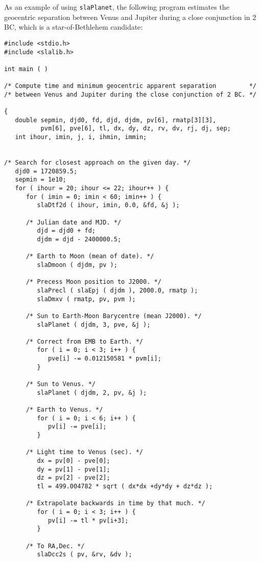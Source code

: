 \documentclass[11pt,fleqn,twoside]{article}
\renewcommand{\_}{{\tt\char'137}}     %
\begin{document}
As an example of using
{\tt slaPlanet},
the following program estimates the geocentric separation
between Venus and Jupiter during a close conjunction
in 2\,BC, which is a star-of-Bethlehem candidate:
\goodbreak
\vspace{-3ex}
\begin{verbatim}
#include <stdio.h>
#include <slalib.h>

int main ( )

/* Compute time and minimum geocentric apparent separation         */
/* between Venus and Jupiter during the close conjunction of 2 BC. */

{
   double sepmin, djd0, fd, djd, djdm, pv[6], rmatp[3][3],
          pvm[6], pve[6], tl, dx, dy, dz, rv, dv, rj, dj, sep;
   int ihour, imin, j, i, ihmin, immin;


/* Search for closest approach on the given day. */
   djd0 = 1720859.5;
   sepmin = 1e10;
   for ( ihour = 20; ihour <= 22; ihour++ ) {
      for ( imin = 0; imin < 60; imin++ ) {
         slaDtf2d ( ihour, imin, 0.0, &fd, &j );

      /* Julian date and MJD. */
         djd = djd0 + fd;
         djdm = djd - 2400000.5;

      /* Earth to Moon (mean of date). */
         slaDmoon ( djdm, pv );

      /* Precess Moon position to J2000. */
         slaPrecl ( slaEpj ( djdm ), 2000.0, rmatp );
         slaDmxv ( rmatp, pv, pvm );

      /* Sun to Earth-Moon Barycentre (mean J2000). */
         slaPlanet ( djdm, 3, pve, &j );

      /* Correct from EMB to Earth. */
         for ( i = 0; i < 3; i++ ) {
            pve[i] -= 0.012150581 * pvm[i];
         }

      /* Sun to Venus. */
         slaPlanet ( djdm, 2, pv, &j );

      /* Earth to Venus. */
         for ( i = 0; i < 6; i++ ) {
            pv[i] -= pve[i];
         }

      /* Light time to Venus (sec). */
         dx = pv[0] - pve[0];
         dy = pv[1] - pve[1];
         dz = pv[2] - pve[2];
         tl = 499.004782 * sqrt ( dx*dx +dy*dy + dz*dz );

      /* Extrapolate backwards in time by that much. */
         for ( i = 0; i < 3; i++ ) {
            pv[i] -= tl * pv[i+3];
         }

      /* To RA,Dec. */
         slaDcc2s ( pv, &rv, &dv );


\end{verbatim}
\end{document}
